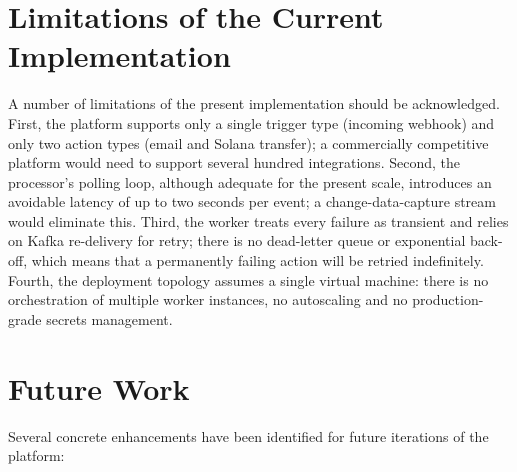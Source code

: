\section{Limitations of the Current Implementation}

A number of limitations of the present implementation should be acknowledged. First, the platform supports only a single trigger type (incoming webhook) and only two action types (email and Solana transfer); a commercially competitive platform would need to support several hundred integrations. Second, the processor's polling loop, although adequate for the present scale, introduces an avoidable latency of up to two seconds per event; a change-data-capture stream would eliminate this. Third, the worker treats every failure as transient and relies on Kafka re-delivery for retry; there is no dead-letter queue or exponential back-off, which means that a permanently failing action will be retried indefinitely. Fourth, the deployment topology assumes a single virtual machine: there is no orchestration of multiple worker instances, no autoscaling and no production-grade secrets management.

\section{Future Work}

Several concrete enhancements have been identified for future iterations of the platform:


